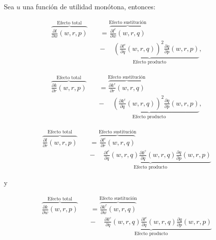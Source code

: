 \documentclass[8pt,a4paper]{extarticle}
\begin{document}
\begin{multicols}{3}
\newpage

\sectionbreak

\begin{boxtheo}
	Sea $u$ una función de utilidad monótona, entonces:
	
	\begin{equation*}
	\begin{aligned}
		\overbrace{\frac{\partial l}{\partial w} (w, r, p)}^{\text{Efecto total}} \quad &= \overbrace{\frac{\partial l^c}{\partial w} (w, r, q)}^{\text{Efecto sustitución}} \\
																						& \underbrace{ - \quad\ \left( \frac{\partial l^c}{\partial q} (w,r,q) \right)^2 \frac{\partial q}{\partial p} (w, r, p)}_{\text{Efecto producto}},
	\end{aligned}
	\end{equation*}	

	\begin{equation*}
	\begin{aligned}
		\overbrace{\frac{\partial k}{\partial r} (w, r, p)}^{\text{Efecto total}} \quad &= \overbrace{\frac{\partial k^c}{\partial r} (w, r, q)}^{\text{Efecto sustitución}} \\
																						& \underbrace{ - \quad\ \left( \frac{\partial k^c}{\partial q} (w,r,q) \right)^2 \frac{\partial q}{\partial p} (w, r, p)}_{\text{Efecto producto}},
	\end{aligned}
	\end{equation*}	
	
	\begin{equation*}
	\begin{aligned}
		\overbrace{\frac{\partial l}{\partial r} (w, r, p)}^{\text{Efecto total}} \quad &= \overbrace{\frac{\partial l^c}{\partial r} (w, r, q)}^{\text{Efecto sustitución}} \\
																						& \underbrace{ - \quad\ \frac{\partial l^c}{\partial q} (w ,r, q) \frac{\partial k^c}{\partial q} (w, r, q) \frac{\partial q}{\partial p} (w, r, p)}_{\text{Efecto producto}}
	\end{aligned}
	\end{equation*}
	
	y

	\begin{equation*}
	\begin{aligned}
		\overbrace{\frac{\partial k}{\partial w} (w, r, p)}^{\text{Efecto total}} \quad &= \overbrace{\frac{\partial k^c}{\partial w} (w, r, q)}^{\text{Efecto sustitución}} \\
																						& \underbrace{ - \quad\ \frac{\partial k^c}{\partial q} (w ,r, q) \frac{\partial l^c}{\partial q} (w, r, q) \frac{\partial q}{\partial p} (w, r, p)}_{\text{Efecto producto}}
	\end{aligned}
	\end{equation*}
	
\end{boxtheo}

\vfill\eject
\columnbreak
\end{multicols}
\end{document}
